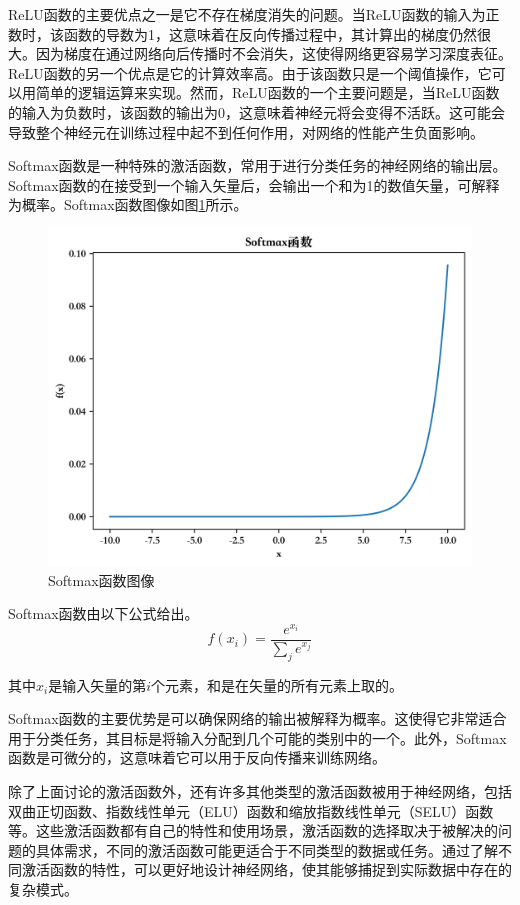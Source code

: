 ReLU函数的主要优点之一是它不存在梯度消失的问题。当ReLU函数的输入为正数时，该函数的导数为1，这意味着在反向传播过程中，其计算出的梯度仍然很大。因为梯度在通过网络向后传播时不会消失，这使得网络更容易学习深度表征。ReLU函数的另一个优点是它的计算效率高。由于该函数只是一个阈值操作，它可以用简单的逻辑运算来实现。然而，ReLU函数的一个主要问题是，当ReLU函数的输入为负数时，该函数的输出为0，这意味着神经元将会变得不活跃。这可能会导致整个神经元在训练过程中起不到任何作用，对网络的性能产生负面影响。


Softmax函数是一种特殊的激活函数，常用于进行分类任务的神经网络的输出层。Softmax函数的在接受到一个输入矢量后，会输出一个和为1的数值矢量，可解释为概率。Softmax函数图像如图\ref{Softmax}所示。

\begin{figure}[htbp]
  \centering
  \includegraphics[width=.65\linewidth]{figures/content/Softmax.png}
  \caption{Softmax函数图像}
  \label{Softmax}
\end{figure}
Softmax函数由以下公式给出。
\begin{equation}
\label{eq:2_17}
f(x_i) = \frac{e^{x_i}} {\sum_{j}{e^{x_j}}}
\end{equation}

其中$x_i$是输入矢量的第$i$个元素，和是在矢量的所有元素上取的。

Softmax函数的主要优势是可以确保网络的输出被解释为概率。这使得它非常适合用于分类任务，其目标是将输入分配到几个可能的类别中的一个。此外，Softmax函数是可微分的，这意味着它可以用于反向传播来训练网络。

除了上面讨论的激活函数外，还有许多其他类型的激活函数被用于神经网络，包括双曲正切函数、指数线性单元（ELU）函数和缩放指数线性单元（SELU）函数等。这些激活函数都有自己的特性和使用场景，激活函数的选择取决于被解决的问题的具体需求，不同的激活函数可能更适合于不同类型的数据或任务。通过了解不同激活函数的特性，可以更好地设计神经网络，使其能够捕捉到实际数据中存在的复杂模式。


